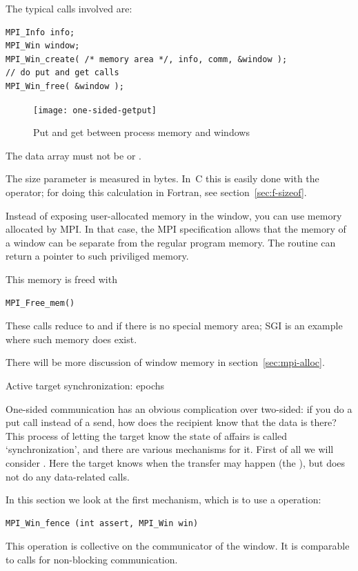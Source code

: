 
The typical calls involved are:
\begin{lstlisting}
MPI_Info info;
MPI_Win window;
MPI_Win_create( /* memory area */, info, comm, &window );
// do put and get calls
MPI_Win_free( &window );
\end{lstlisting}

\begin{figure}[ht]
  \texttt{[image: one-sided-getput]}
  \caption{Put and get between process memory and windows}
  \label{fig:putget}
\end{figure}

%
The data array must not be  or .

The size parameter is measured in bytes. In~C this is easily done
with the  operator;
for doing this calculation in Fortran, see section~\ref{sec:f-sizeof}.

Instead of exposing user-allocated memory in the window,
you can use memory allocated by  MPI. In that case,
the MPI specification allows that the memory of a window can be 
separate from the regular program memory. The routine 
can return a pointer to such priviliged memory.
%

This memory is freed with
\begin{lstlisting}
MPI_Free_mem()
\end{lstlisting}
These calls reduce to  and  if there is no special
memory area; SGI is an example where such memory does exist.

There will be more discussion of window memory in section~\ref{sec:mpi-alloc}.

 {Active target synchronization: epochs}
\label{sec:fence}

One-sided communication has an obvious complication over two-sided: if
you do a put call instead of a send, how does the recipient know that
the data is there? This process of letting the target know the state
of affairs is called `synchronization', and there are various
mechanisms for it. First of all we will consider . Here the target knows when the transfer
may happen (the ), but does not do
any data-related calls.

In this section we look at the first mechanism,
which is to use a  operation:
\begin{lstlisting}
MPI_Win_fence (int assert, MPI_Win win)
\end{lstlisting}
This operation is collective on the communicator of the window.
It is comparable to  calls for non-blocking communication.


